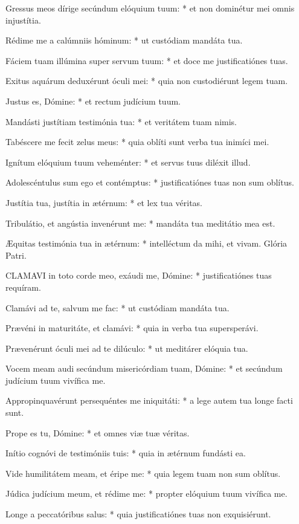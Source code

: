 Gressus meos dírige secúndum elóquium tuum: * et non dominétur mei omnis injustítia.

Rédime me a calúmniis hóminum: * ut custódiam mandáta tua.

Fáciem tuam illúmina super servum tuum: * et doce me justificatiónes tuas.

Exitus aquárum deduxérunt óculi mei: * quia non custodiérunt legem tuam.

Justus es, Dómine: * et rectum judícium tuum.

Mandásti justítiam testimónia tua: * et veritátem tuam nimis.

Tabéscere me fecit zelus meus: * quia oblíti sunt verba tua inimíci mei.

Ignítum elóquium tuum veheménter: * et servus tuus diléxit illud.

Adolescéntulus sum ego et contémptus: * justificatiónes tuas non sum oblítus.

Justítia tua, justítia in ætérnum: * et lex tua véritas.

Tribulátio, et angústia invenérunt me: * mandáta tua meditátio mea est.

Æquitas testimónia tua in ætérnum: * intelléctum da mihi, et vivam. Glória Patri.


\lettrine[lines=2]{C}{LAMAVI} in toto corde meo, exáudi me, Dómine: * justificatiónes tuas requíram.

Clamávi ad te, salvum me fac: * ut custódiam mandáta tua.

Prævéni in maturitáte, et clamávi: * quia in verba tua supersperávi.

Prævenérunt óculi mei ad te dilúculo: * ut meditárer elóquia tua.

Vocem meam audi secúndum misericórdiam tuam, Dómine: * et secúndum judícium tuum vivífica me.

Appropinquavérunt persequéntes me iniquitáti: * a lege autem tua longe facti sunt.

Prope es tu, Dómine: * et omnes viæ tuæ véritas.

Inítio cognóvi de testimóniis tuis: * quia in ætérnum fundásti ea.

Vide humilitátem meam, et éripe me: * quia legem tuam non sum oblítus.

Júdica judícium meum, et rédime me: * propter elóquium tuum vivífica me.

Longe a peccatóribus salus: * quia justificatiónes tuas non exquisiérunt.

